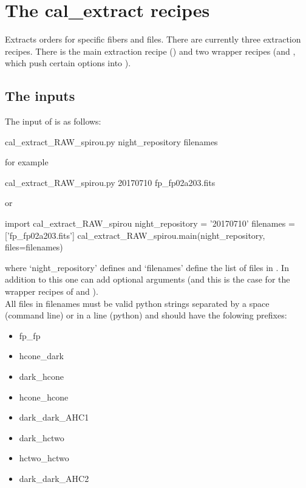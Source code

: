 \clearpage
\newpage
\section{The cal\_extract recipes}
\label{ch:the_recipes:cal_extract_RAW_spirou}

Extracts orders for specific fibers and files. There are currently three extraction recipes. There is the main extraction recipe (\calextractRAW) and two wrapper recipes (\calextractRAWAB and \calextractRAWC, which push certain options into \calextractRAW).

\subsection{The inputs}
The input of \calextractRAW is as follows:
\begin{cmdbox}
cal_extract_RAW_spirou.py night_repository filenames
\end{cmdbox}
\noindent for example
\begin{cmdbox}[title={example}]
cal_extract_RAW_spirou.py 20170710 fp_fp02a203.fits
\end{cmdbox}
\noindent or
\begin{pythonbox}
import cal_extract_RAW_spirou
night_repository = '20170710'
filenames = ['fp_fp02a203.fits']
cal_extract_RAW_spirou.main(night_repository, files=filenames)
\end{pythonbox}

\noindent where `night\_repository' defines \argnightname and `filenames' define the list of files in \argfilenames. In addition to this one can add optional arguments (and this is the case for the wrapper recipes of \calextractRAWAB and \calextractRAWC). \\

\noindent All files in filenames must be valid python strings separated by a space (command line) or in a line (python) and should have the folowing prefixes:
\begin{itemize}
	\item fp\_fp
	\item hcone\_dark
	\item dark\_hcone
	\item hcone\_hcone
	\item dark\_dark\_AHC1
	\item dark\_hctwo
	\item hctwo\_hctwo
	\item dark\_dark\_AHC2
\end{itemize}

